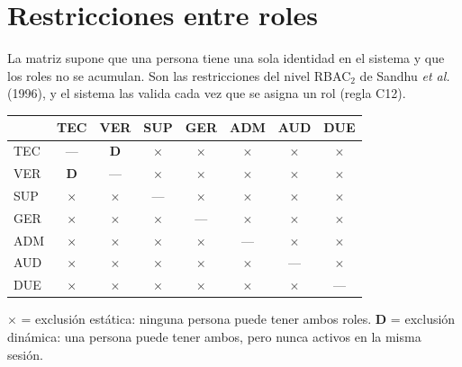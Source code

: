\documentclass[11pt,letterpaper]{article}
\begin{document}
\section{Restricciones entre roles}
\label{sec:exclusion}

La matriz supone que una persona tiene una sola identidad en el sistema y que los roles no se
acumulan. Son las restricciones del nivel RBAC$_2$ de Sandhu \emph{et al.} (1996), y el sistema las
valida cada vez que se asigna un rol (regla C12).

\begin{center}
\small\rmfamily
\renewcommand{\arraystretch}{1.25}
\begin{tabular}{@{}l|c|c|c|c|c|c|c@{}}
 & TEC & VER & SUP & GER & ADM & AUD & DUE \\
\hline
TEC & --- & \textbf{D} & $\times$ & $\times$ & $\times$ & $\times$ & $\times$ \\
\hline
VER & \textbf{D} & --- & $\times$ & $\times$ & $\times$ & $\times$ & $\times$ \\
\hline
SUP & $\times$ & $\times$ & --- & $\times$ & $\times$ & $\times$ & $\times$ \\
\hline
GER & $\times$ & $\times$ & $\times$ & --- & $\times$ & $\times$ & $\times$ \\
\hline
ADM & $\times$ & $\times$ & $\times$ & $\times$ & --- & $\times$ & $\times$ \\
\hline
AUD & $\times$ & $\times$ & $\times$ & $\times$ & $\times$ & --- & $\times$ \\
\hline
DUE & $\times$ & $\times$ & $\times$ & $\times$ & $\times$ & $\times$ & --- \\
\end{tabular}

\vspace{0.3em}
{\footnotesize $\times$ = exclusión estática: ninguna persona puede tener ambos roles.\quad
\textbf{D} = exclusión dinámica: una persona puede tener ambos, pero nunca activos en la misma sesión.}
\end{center}
\end{document}
